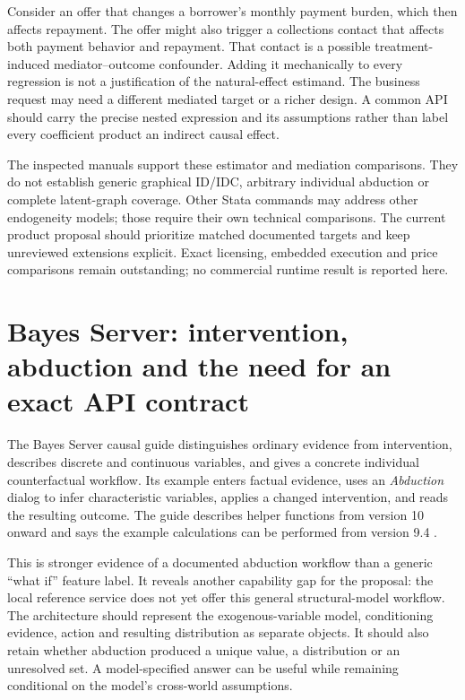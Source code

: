 Consider an offer that changes a borrower's monthly payment burden, which then
affects repayment. The offer might also trigger a collections contact that
affects both payment behavior and repayment. That contact is a possible
treatment-induced mediator--outcome confounder. Adding it mechanically to every
regression is not a justification of the natural-effect estimand. The business
request may need a different mediated target or a richer design. A common API
should carry the precise nested expression and its assumptions rather than
label every coefficient product an indirect causal effect.

The inspected manuals support these estimator and mediation comparisons.
They do not establish generic graphical ID/IDC, arbitrary individual
abduction or complete latent-graph coverage. Other Stata commands may address
other endogeneity models; those require their own technical comparisons. The
current product proposal should prioritize matched documented targets and keep
unreviewed extensions explicit. Exact licensing, embedded execution and price
comparisons remain outstanding; no commercial runtime result is reported here.

\section{Bayes Server: intervention, abduction and the need for an exact API contract}

The Bayes Server causal guide distinguishes ordinary evidence from intervention,
describes discrete and continuous variables, and gives a concrete individual
counterfactual workflow. Its example enters factual evidence, uses an
\emph{Abduction} dialog to infer characteristic variables, applies a changed
intervention, and reads the resulting outcome. The guide describes helper
functions from version 10 onward and says the example calculations can be
performed from version 9.4 \citep{exec13_ci_bayesserver_causality}.

This is stronger evidence of a documented abduction workflow than a generic
``what if'' feature label. It reveals another capability gap for the proposal:
the local reference service does not yet offer this general structural-model
workflow. The architecture should represent the exogenous-variable model,
conditioning evidence, action and resulting distribution as separate objects.
It should also retain whether abduction produced a unique value, a distribution
or an unresolved set. A model-specified answer can be useful while remaining
conditional on the model's cross-world assumptions.

